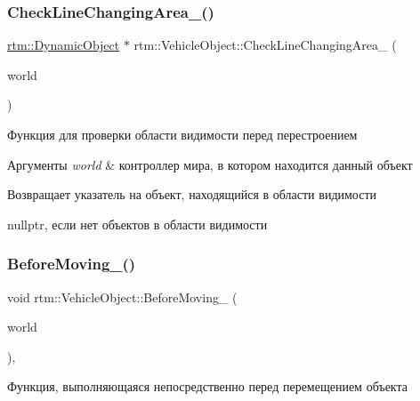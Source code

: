 \subsubsection{\texorpdfstring{Check\+Line\+Changing\+Area\+\_\+()}{CheckLineChangingArea\_()}}
{\footnotesize\ttfamily \hyperlink{classrtm_1_1_dynamic_object}{rtm\+::\+Dynamic\+Object} $\ast$ rtm\+::\+Vehicle\+Object\+::\+Check\+Line\+Changing\+Area\+\_\+ (\begin{DoxyParamCaption}\item[{\hyperlink{classrtm_1_1_world_controller}{World\+Controller} $\ast$const}]{world }\end{DoxyParamCaption})\hspace{0.3cm}{\ttfamily [protected]}}



Функция для проверки области видимости перед перестроением 


\begin{DoxyParams}{Аргументы}
{\em world} & контроллер мира, в котором находится данный объект \\
\hline
\end{DoxyParams}
\begin{DoxyReturn}{Возвращает}
указатель на объект, находящийся в области видимости 

nullptr, если нет объектов в области видимости 
\end{DoxyReturn}
\mbox{\label{classrtm_1_1_vehicle_object_abac2e84c7d102e9170843efd80c53fd2}} 
\subsubsection{\texorpdfstring{Before\+Moving\+\_\+()}{BeforeMoving\_()}}
{\footnotesize\ttfamily void rtm\+::\+Vehicle\+Object\+::\+Before\+Moving\+\_\+ (\begin{DoxyParamCaption}\item[{\hyperlink{classrtm_1_1_world_controller}{World\+Controller} $\ast$const}]{world }\end{DoxyParamCaption})\hspace{0.3cm}{\ttfamily [protected]}, {\ttfamily [virtual]}}



Функция, выполняющаяся непосредственно перед перемещением объекта 


